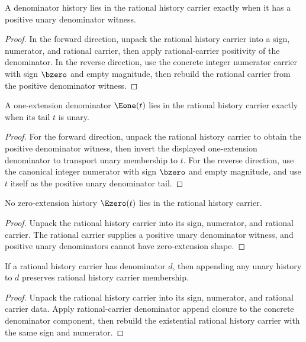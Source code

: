 \begin{theorem}
\label{thm:rat-history-carrier-positive-denominator-equivalence}
A denominator history lies in the rational history carrier exactly when it has
a positive unary denominator witness.
\end{theorem}
\begin{proof}
In the forward direction, unpack the rational history carrier into a sign,
numerator, and rational carrier, then apply rational-carrier positivity of the
denominator. In the reverse direction, use the concrete integer numerator
carrier with sign $\bzero$ and empty magnitude, then rebuild the rational
carrier from the positive denominator witness.
\end{proof}

\begin{theorem}
\label{thm:rat-history-carrier-e1-tail-unary-iff}
A one-extension denominator \(\Eone(t)\) lies in the rational history carrier
exactly when its tail \(t\) is unary.
\end{theorem}
\begin{proof}
For the forward direction, unpack the rational history carrier to obtain the
positive denominator witness, then invert the displayed one-extension
denominator to transport unary membership to \(t\). For the reverse direction,
use the canonical integer numerator with sign \(\bzero\) and empty magnitude,
and use \(t\) itself as the positive unary denominator tail.
\end{proof}

\begin{theorem}
\label{thm:rat-history-carrier-e0-absurd}
No zero-extension history \(\Ezero(t)\) lies in the rational history carrier.
\end{theorem}
\begin{proof}
Unpack the rational history carrier into its sign, numerator, and rational
carrier. The rational carrier supplies a positive unary denominator witness,
and positive unary denominators cannot have zero-extension shape.
\end{proof}

\begin{theorem}
\label{thm:rat-history-carrier-append-unary-denominator-closed}
If a rational history carrier has denominator \(d\), then appending any unary history to \(d\) preserves rational history carrier membership.
\end{theorem}
\begin{proof}
Unpack the rational history carrier into its sign, numerator, and rational carrier data. Apply rational-carrier denominator append closure to the concrete denominator component, then rebuild the existential rational history carrier with the same sign and numerator.
\end{proof}

